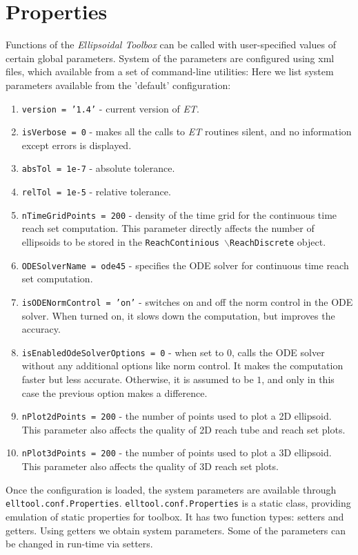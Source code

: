 \section{Properties}
Functions of the {\it Ellipsoidal Toolbox} can be called with
user-specified values of certain global parameters. System of the parameters
are configured using xml files, which  available from a set of command-line
utilities:
Here we list system parameters available from the 'default' configuration:
\begin{enumerate}
\item {\tt version = '1.4'} - current version of {\it ET}.
\item {\tt isVerbose = 0} - makes all the calls to {\it ET}
routines silent, and no information except errors is displayed.
\item {\tt absTol = 1e-7} - absolute tolerance.
\item {\tt relTol = 1e-5} - relative tolerance.
\item {\tt nTimeGridPoints = 200} - density of the time grid for the
continuous time reach set computation.
This parameter directly affects the number of ellipsoids to
be stored in the {\tt ReachContinious $\backslash$ReachDiscrete} object.
\item {\tt ODESolverName = ode45} - specifies the ODE solver for continuous time
reach set computation.
\item {\tt isODENormControl = 'on'} - switches on and off the norm control
in the ODE solver. When turned on, it slows down the computation, but improves
the accuracy.
\item {\tt isEnabledOdeSolverOptions = 0} - when set to $0$, calls the ODE solver
without any additional options like norm control. It makes the computation
faster but less accurate. Otherwise, it is assumed to be $1$, and only in this
case the previous option makes a difference.
\item {\tt nPlot2dPoints = 200} - the number of points used to plot a
2D ellipsoid. This parameter also affects the quality of 2D reach tube
and reach set plots.
\item {\tt nPlot3dPoints = 200} - the number of points used to plot
a 3D ellipsoid. This parameter also affects the quality of 3D reach set plots.
\end{enumerate}
Once the configuration is loaded, the system parameters are available through
{\tt elltool.conf.Properties}.
{\tt elltool.conf.Properties} is a static class, providing emulation of static
properties for toolbox. It has two function types: setters and getters.
Using getters we obtain system parameters.
 Some of the parameters can be changed
in run-time via setters.




